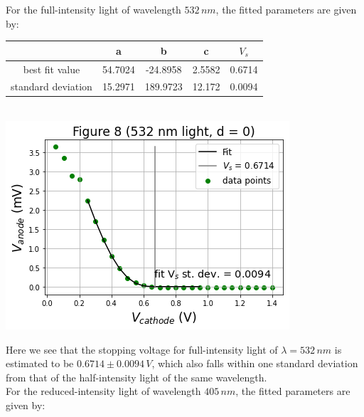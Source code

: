 \documentclass[11pt]{book}
\theoremstyle{break}
\theoremstyle{break}
\begin{document}
For the full-intensity light of wavelength $532\, nm$, the fitted parameters are given by: \begin{center}
\hfill\break
\begin{tabular}{|c|c|c|c|c|}
\hline
 & a & b & c & $V_s$\\
\hline
best fit value & 54.7024 & -24.8958 & 2.5582 & 0.6714\\
\hline
standard deviation & 15.2971 & 189.9723 & 12.172 & 0.0094 \\
\hline
\end{tabular}\\
\hfill\break
\hfill\break
\hfill\break
\includegraphics[scale=0.5]{fig8.png}
\end{center}
Here we see that the stopping voltage for full-intensity light of $\lambda = 532\, nm$ is estimated to be $0.6714\pm 0.0094\, V$, which also falls within one standard deviation from that of the half-intensity light of the same wavelength. \\

For the reduced-intensity light of wavelength $405\, nm$, the fitted parameters are given by:
\end{document}
